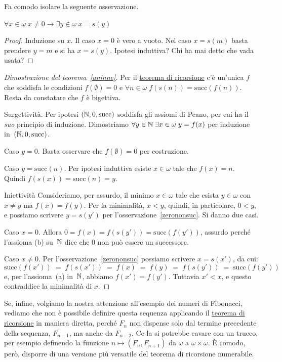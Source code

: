 Fa comodo isolare la seguente osservazione.

\begin{remark}\label{zerononsuc}
	$\forall {x \in \omega} \; x \ne 0 \rightarrow \exists
{y\in\omega} \; x = s(y)$
\end{remark}

\begin{proof}
	Induzione su $x$. Il caso $x = 0$ \`e vero a vuoto. Nel caso $x = s(m)$ basta prendere $y = m$ e si ha $x = s(y)$.
{\drkgrn Ipotesi induttiva? Chi ha mai detto che vada usata?}
\end{proof}

\begin{proof}[Dimostrazione del teorema~\ref{uninne}]
	Per il \hyperref[ric1]{teorema di ricorsione} c'\`e un'unica $f$
che soddisfa le condizioni $f(\emptyset) = 0$ e $\forall {n \in \omega} \; f(s(n)) = \text{succ}(f(n))$.
	Resta da constatare che $f$ \`e bigettiva.

{\drkblu Surgettivit\`a.} Per ipotesi $(\mathbb N, 0, \text{succ})$ soddisfa gli
assiomi di Peano, per cui ha il \textit{suo} principio di induzione.
Dimostriamo $\forall {y\in\mathbb N} \;\exists {x\in\omega}\;y=f(x)$ per induzione in~$(\mathbb N, 0, \text{succ})$.

{\drkred Caso $y = 0$.} Basta osservare che $f(\emptyset) = 0$ per costruzione.

{\drkred Caso $y = \text{succ}(n)$.} Per ipotesi induttiva esiste $x \in
\omega$ tale che $f(x) = n$.\\ Quindi $f(s(x)) = \text{succ}(n)=y$.

{\drkblu Iniettivit\`a} Consideriamo, per assurdo, il minimo $x\in\omega$
tale che esista $y\in\omega$ con $x\neq y$ ma $f(x)=f(y)$. Per la
minimalit\`a, $x<y$, quindi, in particolare, $0<y$, e possiamo scrivere
$y=s(y')$ per l'osservazione~\ref{zerononsuc}. Si danno due casi. 

{\drkred Caso $x = 0$.} Allora $0=f(x)=f(s(y'))=\text{succ}(f(y'))$,
assurdo perch\'e l'assioma (b) su~$\mathbb N$ dice che $0$ non pu\`o essere un
successore.

{\drkred Caso $x \ne 0$.} Per l'osservazione~\ref{zerononsuc} possiamo scrivere $x = s(x')$, da cui:
			\[ \text{succ}(f(x')) \;=\; f(s(x')) \;=\; f(x)
\;=\; f(y) \;=\; f(s(y')) \;=\; \text{succ}(f(y'))
				\]
			e, per l'assioma~(a) in~$\mathbb N$, abbiamo $f(x') =
f(y')$. Tuttavia $x' < x$, e questo contraddice la minimalit\`a di $x$.
\end{proof}

Se, infine, volgiamo la nostra attenzione all'esempio dei numeri di Fibonacci, vediamo che non \`e possibile definire questa sequenza applicando il \hyperref[ric1]{teorema di ricorsione}
in maniera diretta, perch\'e $F_n$ non dispense solo dal termine precedente della sequenza, $F_{n-1}$, ma anche da $F_{n-2}$. Ce la si potrebbe cavare con un trucco, per esempio definendo la funzione
$n \mapsto (F_n,F_{n+1})$ da $\omega$ a $\omega \times \omega$. \`E comodo, per\`o, disporre di una versione pi\`u versatile del teorema di ricorsione numerabile.

